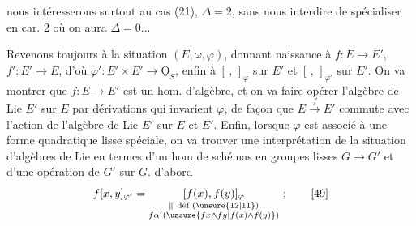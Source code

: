 nous intéresserons surtout au cas (21),  $\Delta=2$, sans nous interdire de spécialiser en car. 2 où on aura $\Delta=0$...

Revenons toujours à la situation $(E,\omega,\varphi)$, donnant naissance à $f:E\to E'$, $f':E'\to E$, d'où $\varphi':E'\times E'\longrightarrow\underline{\mathrm O}_S$, enfin à $[\, ,\,]_\varphi$ sur $E'$ et $[\, ,\,]_{\varphi'}$ sur $E'$. On va montrer que $f:E\to E'$ est un hom. d'algèbre, et  on va faire opérer l'algèbre de Lie $E'$ sur $E$ par dérivations  qui invarient $\varphi$, de façon que $E\xrightarrow{f}E'$ commute avec l'action de l'algèbre de Lie $E'$ sur $E$ et $E'$. Enfin, lorsque $\varphi$  est associé à une forme quadratique lisse spéciale, on va trouver une interprétation de la situation d'algèbres de Lie en termes d'un hom de schémas en groupes lisses $G\to G'$ et d'une opération de $G'$ sur $G$.  d'abord
\[
 f[x,y]_{\varphi'}=
 \underset{\substack{\parallel\ \text{déf }(\unsure{12|11})\\ f\alpha'(\unsure{fx\wedge fy|f(x)\wedge f(y)})}}{[f(x),f(y)]_\varphi}\ ; \tag*{[49]}
\]

